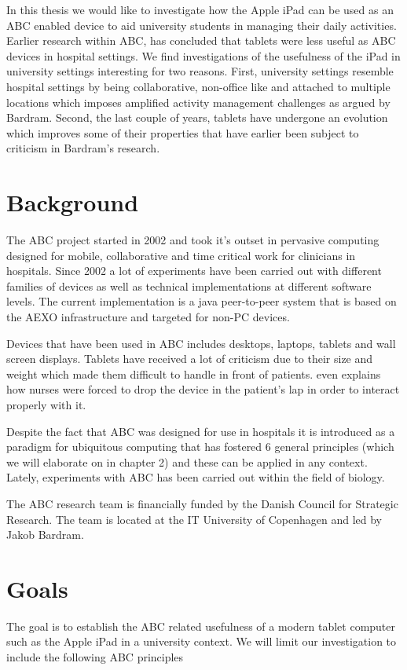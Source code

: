 In this thesis we would like to investigate how the Apple iPad can be used as an ABC enabled device to aid university students in managing their daily activities. Earlier research within ABC, \citet{bardram2009} has concluded that tablets were less useful as ABC devices in hospital settings. We find investigations of the usefulness of the iPad in university settings interesting for two reasons. First, university settings resemble hospital settings by being collaborative, non-office like and attached to multiple locations which imposes amplified activity management challenges as argued by Bardram. Second, the last couple of years, tablets have undergone an evolution which improves some of their properties that have earlier been subject to criticism in Bardram's research.

\section{Background}
The ABC project started in 2002 and took it's outset in pervasive computing designed for mobile, collaborative and time critical work for clinicians in hospitals. Since 2002 a lot of experiments have been carried out with different families of devices as well as technical implementations at different software levels. The current implementation is a java peer-to-peer system that is based on the AEXO infrastructure and targeted for non-PC devices.

Devices that have been used in ABC includes desktops, laptops, tablets and wall screen displays. Tablets have received a lot of criticism due to their size and weight which made them difficult to handle in front of patients. \citet{bardram2009} even explains how nurses were forced to drop the device in the patient's lap in order to interact properly with it.

Despite the fact that ABC was designed for use in hospitals it is introduced as a paradigm for ubiquitous computing that has fostered 6 general principles (which we will elaborate on in chapter 2) and these can be applied in any context. Lately, experiments with ABC has been carried out within the field of biology.

The ABC research team is financially funded by the Danish Council for Strategic Research. The team is located at the IT University of Copenhagen and led by Jakob Bardram.

\section{Goals}
The goal is to establish the ABC related usefulness of a modern tablet computer such as the Apple iPad in a university context. We will limit our investigation to include the following ABC principles

